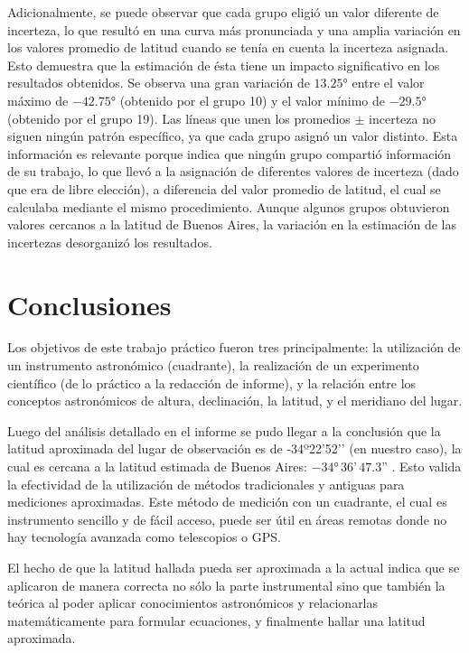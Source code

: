 \documentclass[12pt, a4paper]{article} %
\begin{document}
Adicionalmente, se puede observar que cada grupo eligió un valor diferente de incerteza, lo que resultó en una curva más pronunciada y una amplia variación en los valores promedio de latitud cuando se tenía en cuenta la incerteza asignada. Esto demuestra que la estimación de ésta tiene un impacto significativo en los resultados obtenidos. Se observa una gran variación de $\ang{13.25}$ entre el valor máximo de $-\ang{42.75}$ (obtenido por el grupo 10) y el valor mínimo de $-\ang{29.5}$ (obtenido por el grupo 19). Las líneas que unen los promedios $\pm$ incerteza no siguen ningún patrón específico, ya que cada grupo asignó un valor distinto. Esta información es relevante porque indica que ningún grupo compartió información de su trabajo, lo que llevó a la asignación de diferentes valores de incerteza (dado que era de libre elección), a diferencia del valor promedio de latitud, el cual se calculaba mediante el mismo procedimiento. Aunque algunos grupos obtuvieron valores cercanos a la latitud de Buenos Aires, la variación en la estimación de las incertezas desorganizó los resultados.

\section{Conclusiones}
Los objetivos de este trabajo práctico fueron tres principalmente: la utilización de un instrumento astronómico (cuadrante), la realización de un experimento científico (de lo práctico a la redacción de informe), y la relación entre los conceptos astronómicos de altura, declinación, la latitud, y el meridiano del lugar. 

Luego del análisis detallado en el informe se pudo llegar a la conclusión que la latitud aproximada del lugar de observación es de -34º22’52’’ (en nuestro caso), la cual es cercana a la latitud estimada de Buenos Aires: $-\ang{34} \, 36\text{'} \, 47.3\text{''}$ {\cite{geodatosCoordenadasGeogrxE1ficas}}. 
Esto valida la efectividad de la utilización de métodos tradicionales y antiguas para mediciones aproximadas. Este método de medición con un cuadrante, el cual es instrumento sencillo y de fácil acceso, puede ser útil en áreas remotas donde no hay tecnología avanzada como telescopios o GPS. 

El hecho de que la latitud hallada pueda ser aproximada a la actual indica que se aplicaron de manera correcta no sólo la parte instrumental sino que también la teórica al poder aplicar conocimientos astronómicos y relacionarlas matemáticamente para formular ecuaciones, y finalmente hallar una latitud aproximada. 
\end{document}
